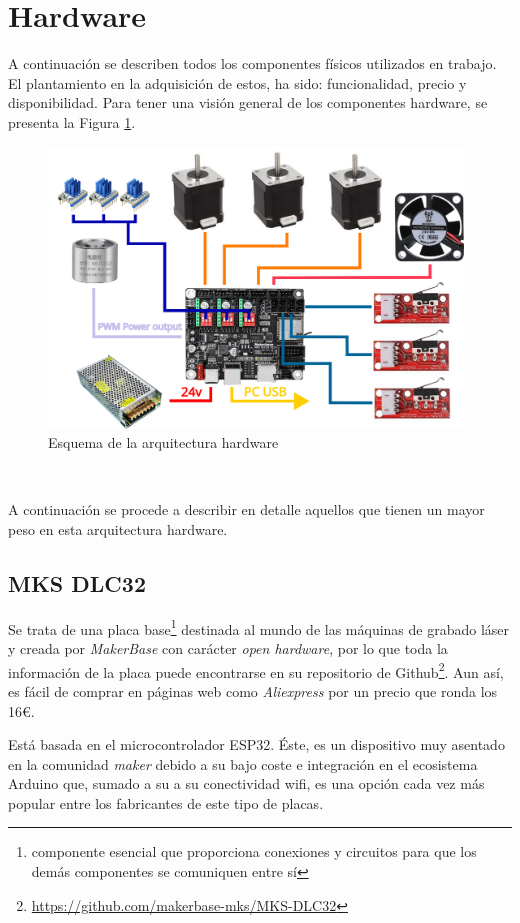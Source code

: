 \section{Hardware}
\label{sec:hardware}
\noindent A continuación se describen todos los componentes físicos utilizados en trabajo. El plantamiento en la adquisición 
de estos, ha sido: funcionalidad, precio y disponibilidad. Para tener una visión general de los componentes hardware, se presenta 
la Figura \ref{fig:hw}.
\begin{figure} [h!]
  \begin{center}
    \includegraphics[width=11cm]{figs/hw.png}
  \end{center}
  \caption{Esquema de la arquitectura hardware}
  \label{fig:hw}
\end{figure}\ 

A continuación se procede a describir en detalle aquellos que tienen un mayor peso en esta arquitectura hardware.
\subsection{MKS DLC32}
\label{subsec:mksdlc32}
\noindent Se trata de una placa base\footnote{componente esencial que proporciona conexiones y circuitos para que los demás componentes se comuniquen entre sí} destinada al mundo de las máquinas de grabado láser y creada por \textit{MakerBase} con carácter \textit{open hardware}, por lo que toda la información de la placa 
puede encontrarse en su repositorio de Github\footnote{\url{https://github.com/makerbase-mks/MKS-DLC32}}. Aun así, es fácil de comprar 
en páginas web como \textit{Aliexpress} por un precio que ronda los 16\euro. 

Está basada en el 
microcontrolador ESP32. Éste, es un dispositivo muy asentado en la comunidad \textit{maker} debido a su bajo coste e integración en el 
ecosistema Arduino que, sumado a su a su conectividad wifi, es una opción cada vez más popular entre los fabricantes de este tipo de placas.

